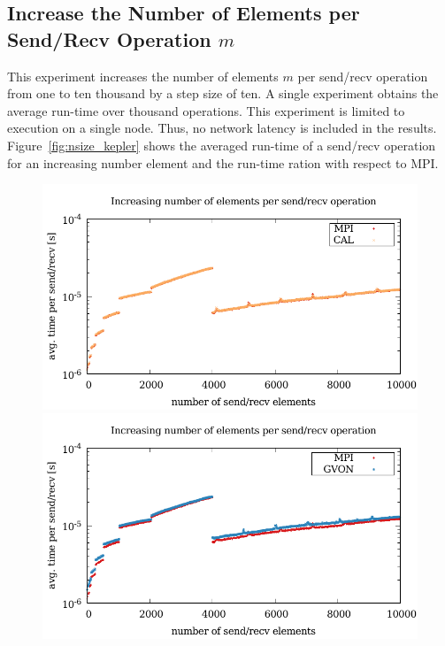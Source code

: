 \subsection*{Increase the Number of Elements per Send/Recv Operation $m$}
This experiment increases the number of elements $m$ per send/recv
operation from one to ten thousand by a step size of ten. A single
experiment obtains the average run-time over thousand operations.
This experiment is limited to execution on a single node. Thus, no
network latency is included in the
results. Figure~\ref{fig:nsize_kepler} shows the averaged run-time of
a send/recv operation for an increasing number element and the
run-time ration with respect to MPI.

\begin{figure}[H]
  \begin{minipage}[t]{0.5\textwidth}
    \includegraphics[width=\textwidth]{plots/50_nsize_cal_laser}
    \includegraphics[width=\textwidth]{plots/50_nsize_gvon_laser}

\end{minipage}
\end{figure}
